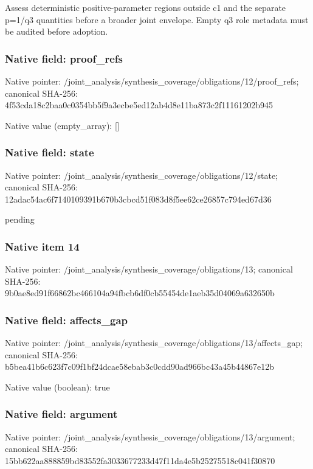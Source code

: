 \documentclass[10pt,a4paper]{article}
\begin{document}
\begingroup\raggedright\sloppy Assess deterministic positive-parameter regions outside c1 and the separate p=\allowbreak{}1/\allowbreak{}q3 quantities before a broader joint envelope. Empty q3 role metadata must be audited before adoption.\par\endgroup

\subsubsection{Native field: proof\_\allowbreak{}refs}
Native pointer: /joint\_\allowbreak{}analysis/synthesis\_\allowbreak{}coverage/obligations/12/proof\_\allowbreak{}refs; canonical SHA-256: 4f53cda18c2baa0c0354bb5f9a3ecbe5ed12ab4d8e11ba873c2f11161202b945

Native value (empty\_\allowbreak{}array): []

\subsubsection{Native field: state}
Native pointer: /joint\_\allowbreak{}analysis/synthesis\_\allowbreak{}coverage/obligations/12/state; canonical SHA-256: 12adac54ac6f7140109391b670b3cbcd51f083d8f5ee62ce26857c794ed67d36

\begingroup\raggedright\sloppy pending\par\endgroup

\subsubsection{Native item 14}
Native pointer: /joint\_\allowbreak{}analysis/synthesis\_\allowbreak{}coverage/obligations/13; canonical SHA-256: 9b0ae8ed91f66862bc466104a94fbcb6df0cb55454de1aeb35d04069a632650b

\subsubsection{Native field: affects\_\allowbreak{}gap}
Native pointer: /joint\_\allowbreak{}analysis/synthesis\_\allowbreak{}coverage/obligations/13/affects\_\allowbreak{}gap; canonical SHA-256: b5bea41b6c623f7c09f1bf24dcae58ebab3c0cdd90ad966bc43a45b44867e12b

Native value (boolean): true

\subsubsection{Native field: argument}
Native pointer: /joint\_\allowbreak{}analysis/synthesis\_\allowbreak{}coverage/obligations/13/argument; canonical SHA-256: 15bb622aa888859bd83552fa3033677233d47f11da4e5b25275518c041f30870
\end{document}

